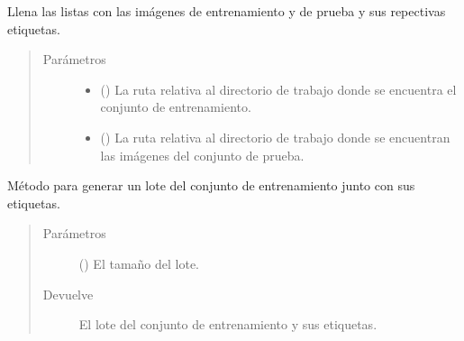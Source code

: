 \begin{fulllineitems}
\begin{fulllineitems}
\label{\detokenize{model_desc:cnn_indoor_classifier_model.CNNClassifierLAR.get_training_and_test_images}}
Llena las listas con las imágenes de entrenamiento y 
de prueba y sus repectivas etiquetas.
\begin{quote}\begin{description}
\item[{Parámetros}] \leavevmode\begin{itemize}
\item {} 
 () \textendash{} La ruta relativa al directorio de trabajo donde se encuentra el conjunto de entrenamiento.

\item {} 
 () \textendash{} La ruta relativa al directorio de trabajo donde se encuentran las imágenes del conjunto de prueba.

\end{itemize}

\end{description}\end{quote}

\end{fulllineitems}


\begin{fulllineitems}
\label{\detokenize{model_desc:cnn_indoor_classifier_model.CNNClassifierLAR.next_batch}}
Método para generar un lote del conjunto de entrenamiento
junto con sus etiquetas.
\begin{quote}\begin{description}
\item[{Parámetros}] \leavevmode
{} () \textendash{} El tamaño del lote.

\item[{Devuelve}] \leavevmode
El lote del conjunto de entrenamiento y sus etiquetas.


\end{description}
\end{quote}
\end{fulllineitems}
\end{fulllineitems}
